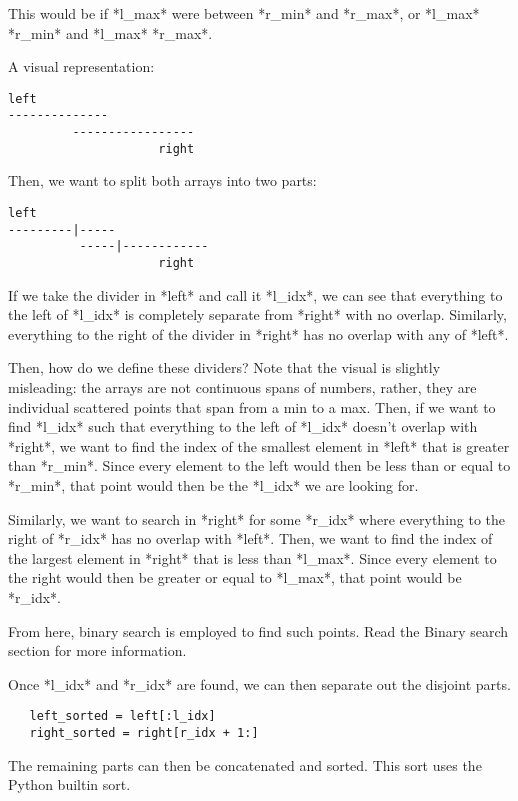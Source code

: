 {{{{{{This would be if *l_max* were between *r_min* and *r_max*, or *l_max* \>
*r_min* and *l_max* \< *r_max*.

A visual representation:

\begin{verbatim}
left
--------------
         -----------------
                     right
\end{verbatim}

Then, we want to split both arrays into two parts:

\begin{verbatim}
left
---------|-----
          -----|------------
                     right
\end{verbatim}

If we take the divider in *left* and call it *l_idx*, we can see that
everything to the left of *l_idx* is completely separate from *right*
with no overlap. Similarly, everything to the right of the divider in
*right* has no overlap with any of *left*.

Then, how do we define these dividers? Note that the visual is slightly
misleading: the arrays are not continuous spans of numbers, rather, they
are individual scattered points that span from a min to a max. Then, if
we want to find *l_idx* such that everything to the left of *l_idx*
doesn't overlap with *right*, we want to find the index of the smallest
element in *left* that is greater than *r_min*. Since every element to
the left would then be less than or equal to *r_min*, that point would
then be the *l_idx* we are looking for.

Similarly, we want to search in *right* for some *r_idx* where
everything to the right of *r_idx* has no overlap with *left*. Then, we
want to find the index of the largest element in *right* that is less
than *l_max*. Since every element to the right would then be greater or
equal to *l_max*, that point would be *r_idx*.

From here, binary search is employed to find such points. Read the
Binary search section for more information.

Once *l_idx* and *r_idx* are found, we can then separate out the
disjoint parts.

\begin{verbatim}
   left_sorted = left[:l_idx]
   right_sorted = right[r_idx + 1:]
\end{verbatim}

The remaining parts can then be concatenated and sorted. This sort uses
the Python builtin sort.

}}}}}}
